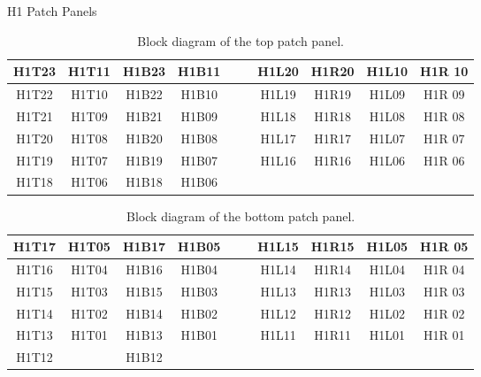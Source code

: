 \documentclass[10pt, xcolor={dvipsnames}, aspectratio = 169, sans,mathserif]{beamer}
\begin{document}
\begin{frame}{H1 Patch Panels}

\begin{table}
\begin{center}
\begin{tabular}{ | c | c | c | c | c | c | c | c | c | c |}
\hline
H1T23 & H1T11 & H1B23 & H1B11 & & & H1L20 & H1R20 & H1L10 & H1R 10 \\
\hline
H1T22 & H1T10 & H1B22 & H1B10 & & & H1L19 & H1R19 & H1L09 & H1R 09 \\
\hline
H1T21 & H1T09 & H1B21 & H1B09 & & & H1L18 & H1R18 & H1L08 & H1R 08 \\
\hline
H1T20 & H1T08 & H1B20 & H1B08 & & & H1L17 & H1R17 & H1L07 & H1R 07 \\
\hline
H1T19 & H1T07 & H1B19 & H1B07 & & & H1L16 & H1R16 & H1L06 & H1R 06 \\
\hline
H1T18 & H1T06 & H1B18 & H1B06 & & & & & &  \\
\hline
\end{tabular}
\caption{Block diagram of the top patch panel.}
\end{center}
\end{table}

\begin{table}
\begin{center}
\begin{tabular}{ | c | c | c | c | c | c | c | c | c | c |}
\hline
H1T17 & H1T05 & H1B17 & H1B05 & & & H1L15 & H1R15 & H1L05 & H1R 05 \\
\hline
H1T16 & H1T04 & H1B16 & H1B04 & & & H1L14 & H1R14 & H1L04 & H1R 04 \\
\hline
H1T15 & H1T03 & H1B15 & H1B03 & & & H1L13 & H1R13 & H1L03 & H1R 03 \\
\hline
H1T14 & H1T02 & H1B14 & H1B02 & & & H1L12 & H1R12 & H1L02 & H1R 02 \\
\hline
H1T13 & H1T01 & H1B13 & H1B01 & & & H1L11 & H1R11 & H1L01 & H1R 01 \\
\hline
H1T12 & & H1B12 & & & & & & &  \\
\hline
\end{tabular}
\caption{Block diagram of the bottom patch panel.}
\end{center}
\end{table}

\end{frame}
\end{document}
